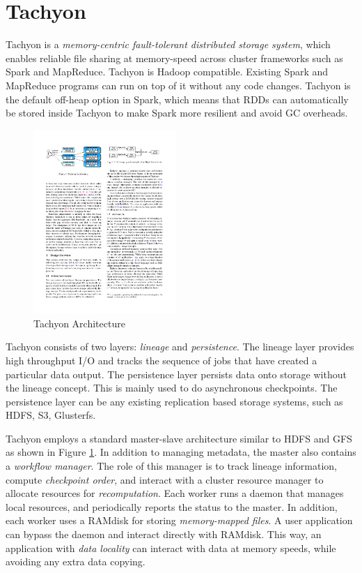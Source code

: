 \documentclass[twocolumn]{article}
\begin{document}
\section{Tachyon}
Tachyon is a \textit{memory-centric fault-tolerant distributed storage system}, which enables reliable file sharing at memory-speed across cluster frameworks such as Spark and MapReduce. 
Tachyon is Hadoop compatible. Existing Spark and MapReduce programs can run on top of it without any code changes. Tachyon is the default off-heap option in Spark, which means that RDDs can automatically be stored inside Tachyon to make Spark more resilient and avoid GC overheads. 

\begin{figure}[htb]
        \centering
        \includegraphics[width=0.48\textwidth]{tachyon_architecture.pdf}
        \caption{Tachyon Architecture}
        \label{fig:tachyon_architecture}
\end{figure}

Tachyon consists of two layers: \textit{lineage} and \textit{persistence}. The lineage layer provides high throughput I/O and tracks the sequence of jobs that have created a particular data output. The persistence layer persists data onto storage without the lineage concept. This is mainly used to do asynchronous checkpoints. The persistence layer can be any existing replication based storage systems, such as HDFS, S3, Glusterfs.

Tachyon employs a standard master-slave architecture similar to HDFS and GFS as shown in Figure \ref{fig:tachyon_architecture}.
In addition to managing metadata, the master also contains a \textit{workflow manager}. 
The role of this manager is to track lineage information, compute \textit{checkpoint order}, and interact with a cluster resource manager to allocate resources for \textit{recomputation}.
Each worker runs a daemon that manages local resources, and periodically reports the status to the master. 
In addition, each worker uses a RAMdisk for storing \textit{memory-mapped files}. A user application can bypass the daemon and interact directly with RAMdisk. This way, an application with \textit{data locality} can interact with data at memory speeds, while avoiding any extra data copying.
\end{document}
